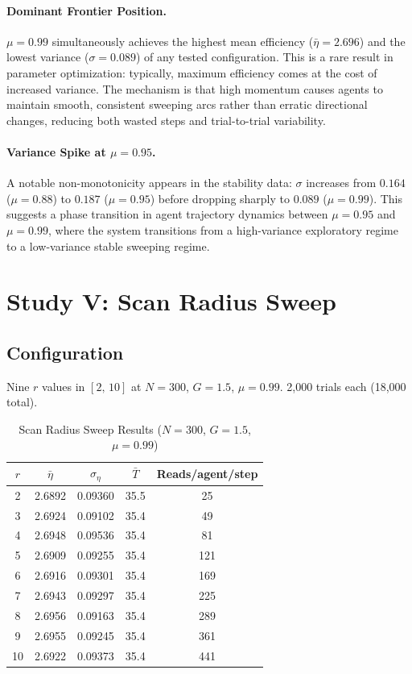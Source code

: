 \documentclass[journal,compsoc]{IEEEtran}
\begin{document}
\paragraph{Dominant Frontier Position.}
$\mu=0.99$ simultaneously achieves the highest mean efficiency ($\bar{\eta}=2.696$)
and the lowest variance ($\sigma=0.089$) of any tested configuration. This is a rare
result in parameter optimization: typically, maximum efficiency comes at the cost of
increased variance. The mechanism is that high momentum causes agents to maintain
smooth, consistent sweeping arcs rather than erratic directional changes, reducing
both wasted steps and trial-to-trial variability.

\paragraph{Variance Spike at $\mu=0.95$.}
A notable non-monotonicity appears in the stability data: $\sigma$ increases from
$0.164$ ($\mu=0.88$) to $0.187$ ($\mu=0.95$) before dropping sharply to $0.089$
($\mu=0.99$). This suggests a phase transition in agent trajectory dynamics between
$\mu=0.95$ and $\mu=0.99$, where the system transitions from a high-variance
exploratory regime to a low-variance stable sweeping regime.

\section{Study V: Scan Radius Sweep}
\label{sec:rsweep}

\subsection{Configuration}
Nine $r$ values in $[2,\,10]$ at $N=300$, $G=1.5$, $\mu=0.99$.
2{,}000 trials each (18{,}000 total).

\begin{table}[H]
\renewcommand{\arraystretch}{1.3}
\caption{Scan Radius Sweep Results ($N=300$, $G=1.5$, $\mu=0.99$)}
\label{tab:rsweep}
\centering
\begin{tabular}{ccccc}
\hline
$r$ & $\bar{\eta}$ & $\sigma_\eta$ & $\bar{T}$ & Reads/agent/step \\
\hline
2  & 2.6892 & 0.09360 & 35.5 & 25 \\
3  & 2.6924 & 0.09102 & 35.4 & 49 \\
4  & 2.6948 & 0.09536 & 35.4 & 81 \\
5  & 2.6909 & 0.09255 & 35.4 & 121 \\
6  & 2.6916 & 0.09301 & 35.4 & 169 \\
7  & 2.6943 & 0.09297 & 35.4 & 225 \\
8  & 2.6956 & 0.09163 & 35.4 & 289 \\
9  & 2.6955 & 0.09245 & 35.4 & 361 \\
10 & 2.6922 & 0.09373 & 35.4 & 441 \\
\hline
\end{tabular}
\end{table}
\end{document}
